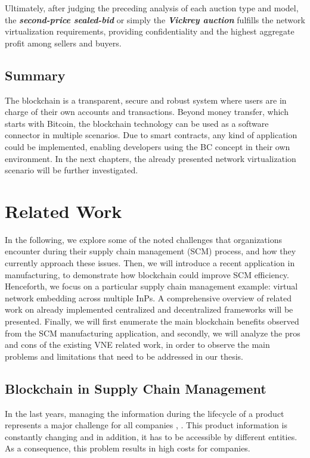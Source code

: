 Ultimately, after judging the preceding analysis of each auction type and model, the \textbf{\textit{second-price sealed-bid}} or simply the \textbf{\textit{Vickrey auction}} fulfills the network virtualization requirements, providing confidentiality and the highest aggregate profit among sellers and buyers.

\section{Summary}

The blockchain is a transparent, secure and robust system where users are in charge of their own accounts and transactions. Beyond money transfer, which starts with Bitcoin, the blockchain technology can be used as a software connector in multiple scenarios. Due to smart contracts, any kind of application could be implemented, enabling developers using the BC concept in their own environment. In the next chapters, the already presented network virtualization scenario will be further investigated.

\chapter{Related Work}
\label{ch:relatedwork}

In the following, we explore some of the noted challenges that organizations encounter during their supply chain management (SCM) process, and how they currently approach these issues. Then, we will introduce a recent application in manufacturing, to demonstrate how blockchain could improve SCM efficiency. Henceforth, we focus on a particular supply chain management example: virtual network embedding across multiple InPs. A comprehensive overview of related work on already implemented centralized and decentralized frameworks will be presented. Finally, we will first enumerate the main blockchain benefits observed from the SCM manufacturing application, and secondly, we will analyze the pros and cons of the existing VNE related work, in order to observe the main problems and limitations that need to be addressed in our thesis.

\section{Blockchain in Supply Chain Management}

In the last years, managing the information during the lifecycle of a product represents a major challenge for all companies \citep{karkkainen2003product}, \citep{tuttle2002you}. This product information is constantly changing and in addition, it has to be accessible by different entities. As a consequence, this problem results in high costs for companies. 

